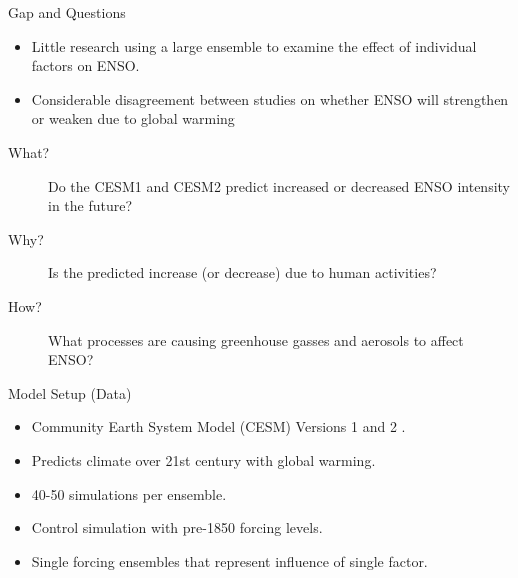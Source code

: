 \documentclass{beamer}
\begin{document}
\begin{frame}
  \begin{block}{Gap and Questions}
    \begin{itemize}
    \item Little research using a large ensemble to examine the effect of individual factors on ENSO.
    \item Considerable disagreement between studies on whether ENSO will strengthen or weaken due to global warming
    \end{itemize}
    \begin{description}
    \item[What?] Do the CESM1 and CESM2 predict increased or decreased ENSO intensity in the future?
    \item[Why?] Is the predicted increase (or decrease) due to human activities?
    \item[How?] What processes are causing greenhouse gasses and aerosols to affect ENSO?
    \end{description}
  \end{block}
  \vfill

  \begin{block}{Model Setup (Data)}
    \begin{itemize}
    \item Community Earth System Model (CESM) Versions 1 and 2 \citep{kay2015community} \citep{danabasoglu2020community}.
    \item Predicts climate over 21st century with global warming.
    \item 40-50 simulations per ensemble.
    \item Control simulation with pre-1850 forcing levels.
    \item Single forcing ensembles that represent influence of single factor.
    \end{itemize}
  \end{block}
  \vfill


\end{frame}
\end{document}
